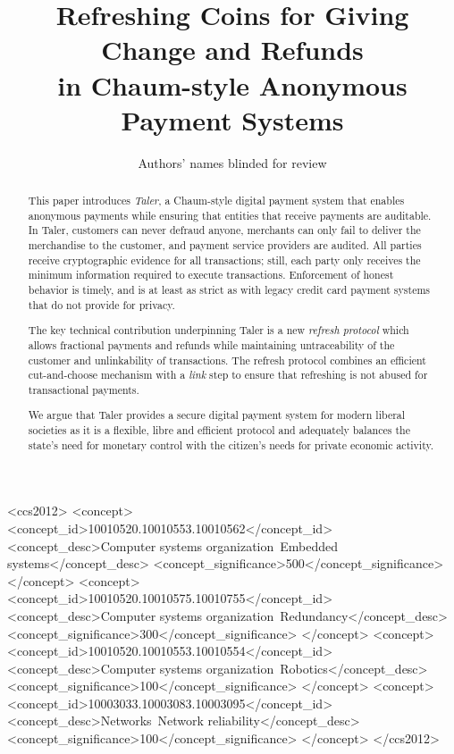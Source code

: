 \documentclass[sigconf, authordraft]{acmart}
\begin{document}
\title{Refreshing Coins for Giving Change and Refunds \\ in Chaum-style Anonymous Payment Systems}
\subtitle{Authors' names blinded for review}






\begin{abstract}
This paper introduces {\em Taler}, a Chaum-style digital payment system that
enables anonymous payments while ensuring that entities that receive
payments are auditable.  In Taler, customers can
never defraud anyone, merchants can only fail to deliver the
merchandise to the customer, and payment service providers are
audited.
All parties receive cryptographic evidence for all
transactions; still, each party only receives the minimum information
required to execute transactions.  Enforcement of honest behavior is
timely, and is at least as strict as with legacy credit card payment
systems that do not provide for privacy.

The key technical contribution underpinning Taler is a new {\em
  refresh protocol} which allows fractional payments and refunds while
maintaining untraceability of the customer and unlinkability of
transactions.  The refresh protocol combines an
efficient cut-and-choose mechanism with a {\em link} step to ensure
that refreshing is not abused for transactional payments.

We argue that Taler provides a secure digital payment system for modern
liberal societies as it is a flexible, libre and efficient protocol
and adequately balances the state's need for monetary control with the
citizen's needs for private economic activity.
\end{abstract}

%
%
\begin{CCSXML}
<ccs2012>
 <concept>
  <concept_id>10010520.10010553.10010562</concept_id>
  <concept_desc>Computer systems organization~Embedded systems</concept_desc>
  <concept_significance>500</concept_significance>
 </concept>
 <concept>
  <concept_id>10010520.10010575.10010755</concept_id>
  <concept_desc>Computer systems organization~Redundancy</concept_desc>
  <concept_significance>300</concept_significance>
 </concept>
 <concept>
  <concept_id>10010520.10010553.10010554</concept_id>
  <concept_desc>Computer systems organization~Robotics</concept_desc>
  <concept_significance>100</concept_significance>
 </concept>
 <concept>
  <concept_id>10003033.10003083.10003095</concept_id>
  <concept_desc>Networks~Network reliability</concept_desc>
  <concept_significance>100</concept_significance>
 </concept>
</ccs2012>
\end{CCSXML}
\end{document}
